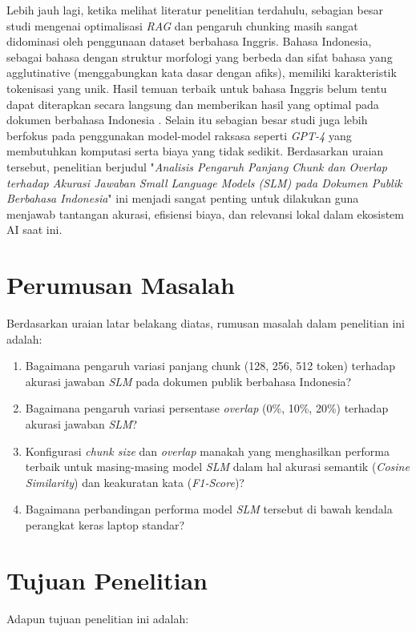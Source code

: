 Lebih jauh lagi, ketika melihat literatur penelitian terdahulu, sebagian besar studi mengenai optimalisasi \textit{RAG} dan pengaruh chunking masih sangat didominasi oleh penggunaan dataset berbahasa Inggris. Bahasa Indonesia, sebagai bahasa dengan struktur morfologi yang berbeda dan sifat bahasa yang agglutinative (menggabungkan kata dasar dengan afiks), memiliki karakteristik tokenisasi yang unik. Hasil temuan terbaik untuk bahasa Inggris belum tentu dapat diterapkan secara langsung dan memberikan hasil yang optimal pada dokumen berbahasa Indonesia \citep{cahyawijaya2024cendol}. Selain itu sebagian besar studi juga lebih berfokus pada penggunakan model-model raksasa seperti \textit{GPT-4} yang membutuhkan komputasi serta biaya yang tidak sedikit. Berdasarkan uraian tersebut, penelitian berjudul "\textit{Analisis Pengaruh Panjang Chunk dan Overlap terhadap Akurasi Jawaban Small Language Models (SLM) pada Dokumen Publik Berbahasa Indonesia}" ini menjadi sangat penting untuk dilakukan guna menjawab tantangan akurasi, efisiensi biaya, dan relevansi lokal dalam ekosistem AI saat ini.

\section{Perumusan Masalah}
Berdasarkan uraian latar belakang diatas, rumusan masalah dalam penelitian ini adalah:
\begin{enumerate}
    \item Bagaimana pengaruh variasi panjang chunk (128, 256, 512 token) terhadap akurasi jawaban \textit{SLM} pada dokumen publik berbahasa Indonesia?
    \item Bagaimana pengaruh variasi persentase \textit{overlap} (0\%, 10\%, 20\%) terhadap akurasi jawaban \textit{SLM}?
    \item Konfigurasi \textit{chunk size} dan \textit{overlap} manakah yang menghasilkan performa terbaik untuk masing-masing model \textit{SLM} dalam hal akurasi semantik (\textit{Cosine Similarity}) dan keakuratan kata (\textit{F1-Score})?
    \item Bagaimana perbandingan performa model \textit{SLM} tersebut di bawah kendala perangkat keras laptop standar?
\end{enumerate}


\section{Tujuan Penelitian}
Adapun tujuan penelitian ini adalah:

